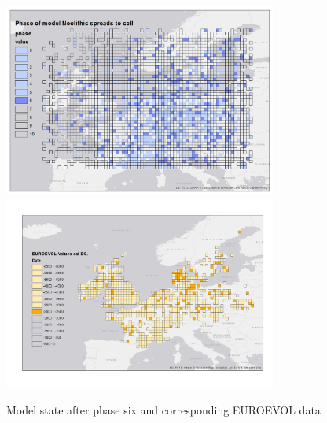 \begin{figure}
\centering
	\includegraphics[width=0.8\textwidth]{figures/model-6}
	\includegraphics[width=0.8\textwidth]{figures/euroevol-6}
  \caption{Model state after phase six and corresponding EUROEVOL data}
  \label{fig:compare6}
\end{figure}

